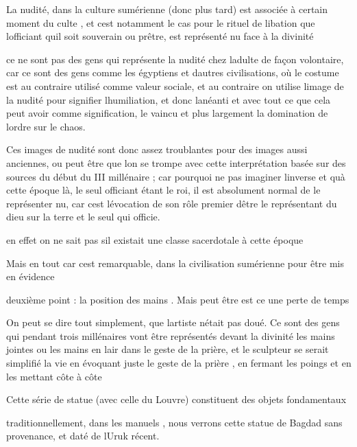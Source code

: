 \documentclass{article}
\begin{document}
La nudité, dans la culture sumérienne (donc plus tard) est associée à
certain moment du culte , et c{\textquotesingle}est notamment le cas
pour le rituel de libation que l{\textquotesingle}officiant
qu{\textquotesingle}il soit souverain ou prêtre, est représenté nu face
à la divinité

ce ne sont pas des gens qui représente la nudité chez
l{\textquotesingle}adulte de façon volontaire, car ce sont des gens
comme les égyptiens et d{\textquotesingle}autres civilisations, où le
costume est au contraire utilisé comme valeur sociale, et au contraire
on utilise l{\textquotesingle}image de la nudité pour signifier
l{\textquotesingle}humiliation, et donc l{\textquotesingle}anéanti et
avec tout ce que cela peut avoir comme signification, le vaincu et plus
largement la domination de l{\textquotesingle}ordre sur le chaos.

Ces images de nudité sont donc assez troublantes pour des images aussi
anciennes, ou peut être que l{\textquotesingle}on se trompe avec cette
interprétation basée sur des sources du début du III millénaire ; car
pourquoi ne pas imaginer l{\textquotesingle}inverse et
qu{\textquotesingle}à cette époque là, le seul officiant étant le roi,
il est absolument normal de le représenter nu, car
c{\textquotesingle}est l{\textquotesingle}évocation de son rôle premier
d{\textquotesingle}être le représentant du dieu sur la terre et le seul
qui officie.

en effet on ne sait pas s{\textquotesingle}il existait une classe
sacerdotale à cette époque

Mais en tout car c{\textquotesingle}est remarquable, dans la
civilisation sumérienne pour être mis en évidence

deuxième point : la position des mains . Mais  peut être est ce une
perte de temps

On peut se dire  tout simplement, que l{\textquotesingle}artiste
n{\textquotesingle}était pas doué. Ce sont des gens qui pendant trois
millénaires vont être représentés devant la divinité les mains jointes
ou les mains en l{\textquotesingle}air dans le geste de la prière, et
le sculpteur se serait simplifié la vie en évoquant juste le geste de
la prière , en fermant les poings et en les mettant côte à côte

Cette série de statue (avec celle du Louvre) constituent des objets
fondamentaux

traditionnellement, dans les manuels , nous verrons cette statue de
Bagdad sans provenance, et daté de l{\textquotesingle}Uruk récent.
\end{document}
